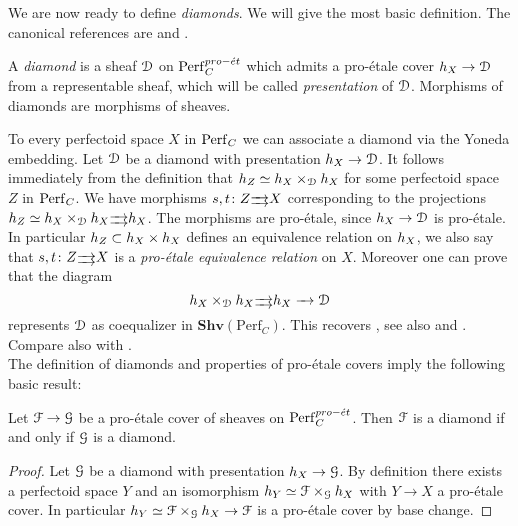 We are now ready to define \emph{diamonds}. We will give the most basic definition. The canonical references are \cite{Scholzeetcoh21} and \cite{SW20}.

\begin{definition}
A \emph{diamond} is a sheaf $\mathcal{D}$ on $\mathrm{Perf}_{C}^{pro-\acute{e}t}$ which admits a  pro-\'{e}tale cover ${h_{X}}\to\mathcal{D}$ from a representable sheaf, which will be called
\emph{presentation} of $\mathcal{D}$.
Morphisms of diamonds are morphisms of sheaves.
\end{definition}
To every perfectoid space $X$ in $\mathrm{Perf}_{C}$ we can associate a diamond via the Yoneda embedding.
Let $\mathcal{D}$ be a diamond with presentation ${h_{X}}\to\mathcal{D}$. It follows immediately from the definition that
${h_{Z}}\simeq{h_{X}}\times_{\mathcal{D}}{h_{X}}$ for some perfectoid space $Z$ in $\mathrm{Perf}_{C}$.
We have morphisms $s,t\colon Z\substack{\xrightarrow{\hspace{0.25cm}}\\[-1.2em] \xrightarrow{\hspace{0.25cm}}} X$ 
corresponding to the projections ${h_{Z}}\simeq{h_{X}}\times_{\mathcal{D}}{h_{X}}\substack{\xrightarrow{\hspace{0.25cm}}\\[-1.2em] \xrightarrow{\hspace{0.25cm}}}{h_{X}}$.
The morphisms are pro-\'{e}tale, since ${h_{X}}\to\mathcal{D}$ is pro-\'{e}tale.
In particular ${h_{Z}}\subset {h_{X}}\times{h_{X}}$ defines an equivalence relation on ${h_{X}}$, we also say that $s,t\colon Z\substack{\xrightarrow{\hspace{.25cm}}\\[-1.2em] \xrightarrow{\hspace{0.25cm}}} X$ 
is a \emph{pro-\'{e}tale equivalence relation} on $X$. Moreover one can prove that
the diagram 
\[{h_{X}}\times_{\mathcal{D}}{h_{X}}\substack{\xrightarrow{\hspace{0.25cm}}\\[-1.2em] \xrightarrow{\hspace{0.25cm}}}{h_{X}}\xrightarrow{\hspace{0.25cm}}\mathcal{D}\]
represents $\mathcal{D}$ as coequalizer in $\mathbf{Shv}(\mathrm{Perf}_{C})$. This recovers \cite[definition 11.1]{Scholzeetcoh21}, 
see also \cite[definition 8.3.1]{SW20} and \cite{Hansen16}. Compare also with \cite[definition I.5.1]{Knutson71}.
\\





The definition of diamonds and properties of pro-\'{e}tale covers imply the following basic result:
\begin{prop}
Let $\mathcal{F}\to\mathcal{G}$ be a pro-\'{e}tale cover of sheaves on $\mathrm{Perf}_{C}^{pro-\acute{e}t}$. Then $\mathcal{F}$ is a diamond if and only if $\mathcal{G}$ is a diamond.
\end{prop}
\begin{proof}
Let $\mathcal{G}$ be a diamond with presentation ${h_{X}}\to\mathcal{G}$. By definition there exists a perfectoid space $Y$ and an isomorphism
${h_{Y}}\simeq\mathcal{F}\times_{\mathcal{G}}{h_{X}}$ with $Y\to X$ a pro-\'{e}tale cover. In particular ${h_{Y}}\simeq\mathcal{F}\times_{\mathcal{G}}{h_{X}}\to\mathcal{F}$
is a pro-\'{e}tale cover by base change.
\end{proof}

